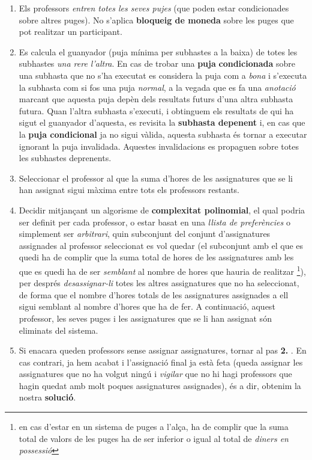 \documentclass[10pt,twocolumn]{article}
\begin{document}
\begin{enumerate}
	\item Els professors \textit{entren totes les seves pujes} (que poden estar condicionades sobre altres puges). No s'aplica \textbf{bloqueig de moneda} sobre les puges que pot realitzar un participant.
	\item Es calcula el guanyador (puja mínima per subhastes a la baixa) de totes les subhastes \textit{una rere l'altra}. En cas de trobar una \textbf{puja} \textbf{condicionada} sobre una subhasta que no s'ha executat es considera la puja com a \textit{bona} i s'executa la subhasta com si fos una puja \textit{normal}, a la vegada que es fa una \textit{anotació} marcant que aquesta puja depèn dels resultats futurs d'una altra subhasta futura. Quan l'altra subhasta s'executi, i obtinguem els resultats de qui ha sigut el guanyador d'aquesta, es revisita la \textbf{subhasta depenent} i, en cas que la \textbf{puja condicional} ja no sigui vàlida, aquesta subhasta és tornar a executar ignorant la puja invalidada. Aquestes invalidacions es propaguen sobre totes les subhastes deprenents.
	\item Seleccionar el professor al que la suma d'hores de les assignatures que se li han assignat sigui màxima entre tots els professors restants.
	\item Decidir mitjançant un algorisme de \textbf{complexitat polinomial}, el qual podria ser definit per cada professor, o estar basat en una \textit{llista de preferències} o simplement ser \textit{arbitrari}, quin subconjunt del conjunt d'assignatures assignades al professor seleccionat es vol quedar (el subconjunt amb el que es quedi ha de complir que la suma total de hores de les assignatures amb les que es quedi ha de ser \textit{semblant} al nombre de hores que hauria de realitzar \footnote{en cas d'estar en un sistema de puges a l'alça, ha de complir que la suma total de valors de les puges ha de ser inferior o igual al total de \textit{diners en possessió}}), per després \textit{desassignar-li} totes les altres assignatures que no ha seleccionat, de forma que el nombre d'hores totals de les assignatures assignades a ell sigui semblant al nombre d'hores que ha de fer. A continuació, aquest professor, les seves puges i les assignatures que se li han assignat són eliminats del sistema.
	\item Si enacara queden professors sense assignar assignatures, tornar al pas \textbf{2.} . En cas contrari, ja hem acabat i l'assignació final ja està feta (queda assignar les assignatures que no ha volgut ningú i \textit{vigilar} que no hi hagi professors que hagin quedat amb molt poques assignatures assignades), és a dir, obtenim la nostra \textbf{solució}.
\end{enumerate}
\end{document}
